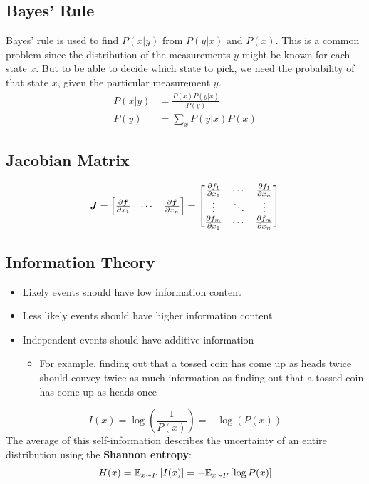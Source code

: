 \begin{multicols}{2}
	\subsection{Bayes' Rule}
	Bayes' rule is used to find $P(x|y)$ from $P(y|x)$ and $P(x)$. This is a common problem since the distribution of the measurements $y$ might be known for each state $x$. But to be able to decide which state to pick, we need the probability of that state $x$, given the particular measurement $y$.
	\begin{align*}
	P(x|y) &= \frac{P(x)P(y|x)}{P(y)}\\
	P(y)   &= \sum_x P(y|x)P(x)
	\end{align*}

	\subsection{Jacobian Matrix}
	\[ \bol{J} =
	\begin{bmatrix} \frac{\partial \bol{f}}{\partial x_1} & \cdots & \frac{\partial \bol{f}}{\partial x_n} \end{bmatrix} =
	\begin{bmatrix}
	\frac{\partial f_1}{\partial x_1} & \cdots & \frac{\partial f_1}{\partial x_n}\\
	\vdots & \ddots & \vdots \\
	\frac{\partial f_m}{\partial x_1} & \cdots & \frac{\partial f_m}{\partial x_n}
	 \end{bmatrix}   \]

	\subsection{Information Theory}
	\begin{itemize}
		\item Likely events should have low information content
		\item Less likely events should have higher information content
		\item Independent events should have additive information
		\begin{itemize}
			\item For example, finding out that a tossed coin has come up as heads twice should convey twice as much information as finding out that a tossed coin has come up as heads once
		\end{itemize}
	\end{itemize}
	\[ I(x) = \log\left(\frac{1}{P(x)}\right) = -\log \left(P(x)\right) \]
	The average of this self-information describes the uncertainty of an entire distribution using the \textbf{Shannon entropy}:
	\[ H(x) = \mathbb{E}_{x\sim P}\left[I(x)\right] = -\mathbb{E}_{x\sim P}\left[\log P(x)\right] \]


\end{multicols}
